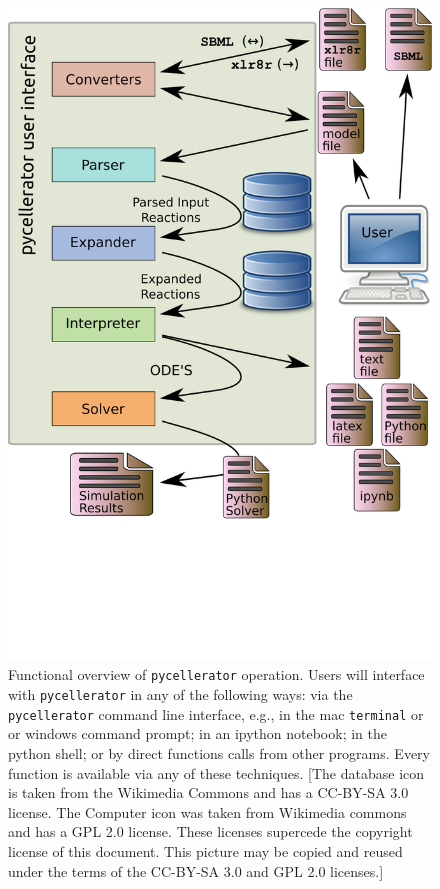 \begin{figure}[ht]
\caption{Functional overview of {\tt pycellerator} operation. Users will interface with
{\tt pycellerator} in any of the following ways: via the {\tt pycellerator} command line interface, e.g., in the mac {\tt terminal} or or windows command prompt; in an ipython notebook; in the python shell; or by direct functions calls from other programs. 
 Every function is available via any of these techniques. [The database icon is taken from the Wikimedia Commons and has a CC-BY-SA 3.0 license. The Computer icon was taken from Wikimedia commons and has a GPL 2.0 license. These licenses supercede the copyright license of this document. This picture may be copied and reused under the terms of the CC-BY-SA 3.0 and GPL 2.0 licenses.] }\label{fig:scheme}
\begin{center}
\includegraphics[width=.75\textwidth]{pyxlr8r-scheme.png}
\end{center}
\end{figure}

